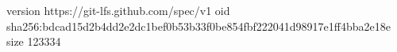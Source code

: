 version https://git-lfs.github.com/spec/v1
oid sha256:bdcad15d2b4dd2e2dc1bef0b53b33f0be854fbf222041d98917e1ff4bba2e18e
size 123334
